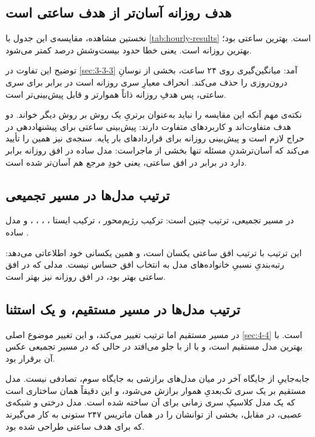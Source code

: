 \subsection*{هدف روزانه آسان‌تر از هدف ساعتی است}

نخستین مشاهده، مقایسه‌ی این جدول با \cref{tab:hourly-results} است. بهترین
 ساعتی  بود؛ بهترین  روزانه  است. یعنی خطا
حدود بیست‌وشش درصد کمتر می‌شود.

توضیح این تفاوت در \cref{sec:3-3-3} آمد: میانگین‌گیری روی ۲۴ ساعت، بخشی از نوسانِ درون‌روزی
را حذف می‌کند. انحراف معیارِ سری روزانه  است در برابر  برای سری
ساعتی، پس هدفِ روزانه ذاتاً هموارتر و قابل پیش‌بینی‌تر است.

نکته‌ی مهم آنکه این مقایسه را نباید به‌عنوان برتریِ یک روش بر روش دیگر خواند. دو هدف
متفاوت‌اند و کاربردهای متفاوت دارند: پیش‌بینی ساعتی برای پیشنهاددهی در حراج لازم است
و پیش‌بینی روزانه برای قراردادهای بار پایه. سنجه‌ی  نیز همین را تأیید می‌کند
که آسان‌ترشدنِ مسئله تنها بخشی از ماجراست: مدل ساده در افق روزانه  برابر
 دارد در برابر  در افق ساعتی، یعنی خودِ مرجع هم آسان‌تر شده
است.

\subsection*{ترتیب مدل‌ها در مسیر تجمیعی}

در مسیر تجمیعی، ترتیب چنین است: ترکیب رژیم‌محور ، ترکیب ایستا
،  ،  ، 
،   و مدل ساده .

این ترتیب با ترتیب افق ساعتی یکسان است، و همین یکسانی خود اطلاعاتی می‌دهد: رتبه‌بندیِ
نسبیِ خانواده‌های مدل به انتخاب افق حساس نیست. مدلی که در افق ساعتی بهتر بود، در افق
روزانه نیز بهتر است.

\subsection*{ترتیب مدل‌ها در مسیر مستقیم، و یک استثنا}

در مسیر مستقیم اما ترتیب تغییر می‌کند، و این تغییر موضوع اصلی \cref{sec:4-4} است.
 با  بهترین مدل مستقیم است، و  با 
از  با  جلو می‌افتد  در حالی که در مسیر تجمیعی عکس آن
برقرار بود.

جابه‌جاییِ  از جایگاه آخر در میان مدل‌های برازشی به جایگاه سوم، تصادفی
نیست. مدل مستقیم بر یک سری تک‌بعدیِ هموار برازش می‌شود، و این دقیقاً همان ساختاری است
که یک مدل کلاسیکِ سری زمانی برای آن ساخته شده است. مدل درختی و شبکه‌ی عصبی، در مقابل،
بخشی از توانشان را در همان ماتریس ۲۴۷ ستونی به کار می‌گیرند که برای هدف ساعتی طراحی
شده بود.

